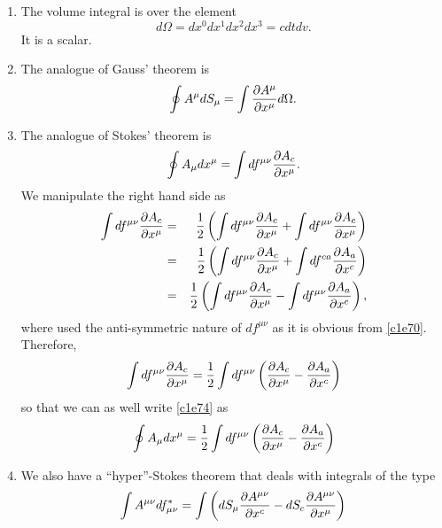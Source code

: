 \begin{enumerate}
\begin{enumerate}
\item The volume integral is over the element
\begin{equation}\label{c1e73}
d\Omega = dx^0 dx^1 dx^2 dx^3 = cdtdv.
\end{equation}
It is a scalar.

\item The analogue of Gauss' theorem is
\begin{equation}\label{c1e74}
\oint A^\mu dS_\mu = \int \frac{\partial{A^\mu}}{\partial{x^\mu}}d\Omega.
\end{equation}

\item The analogue of Stokes' theorem is
\begin{equation}\label{c1e75}
\oint A_\mu dx^\mu = \int df^{\mu\nu}\frac{\partial{A_{c}}}{\partial{x^\mu}}.
\end{equation}
We manipulate the right hand side as
\begin{eqnarray*}
\int df^{\mu\nu}\frac{\partial{A_{c}}}{\partial{x^\mu}} &=& \frac{1}{2}\left(\int df^{\mu\nu}\frac{\partial{A_{c}}}{\partial{x^\mu}} +
\int df^{\mu\nu}\frac{\partial{A_{c}}}{\partial{x^\mu}}\right) \\
&=& \frac{1}{2}\left(\int df^{\mu\nu}\frac{\partial{A_{c}}}{\partial{x^\mu}} + 
    \int df^{c a}\frac{\partial{A_{a}}}{\partial{x^c}}\right) \\
&=& \frac{1}{2}\left(\int df^{\mu\nu}\frac{\partial{A_{c}}}{\partial{x^\mu}} - 
    \int df^{\mu\nu}\frac{\partial{A_{a}}}{\partial{x^c}}\right),
\end{eqnarray*}
where used the anti-symmetric nature of $df^{\mu\nu}$ as it is obvious from 
\eqref{c1e70}. Therefore,
\[
\int df^{\mu\nu}\frac{\partial{A_{c}}}{\partial{x^\mu}} = 
\frac{1}{2}\int df^{\mu\nu}\left(\frac{\partial{A_{c}}}{\partial{x^\mu}} - \frac{\partial{A_{a}}}{\partial{x^c}}\right)
\]
so that we can as well write \eqref{c1e74} as
\begin{equation}\label{c1e76}
\oint A_\mu dx^\mu = \frac{1}{2}\int df^{\mu\nu}
\left(\frac{\partial{A_{c}}}{\partial{x^\mu}} - \frac{\partial{A_{a}}}{\partial{x^c}}\right)
\end{equation}

\item We also have a ``hyper''-Stokes theorem that deals with integrals of the 
type
\begin{equation}\label{c1e77}
\int A^{\mu\nu}df^\ast_{\mu\nu} = 
\int\left(dS_\mu\frac{\partial{A^{\mu\nu}}}{\partial{x^c}} - dS_c\frac{\partial{A^{\mu\nu}}}{\partial{x^\mu}}\right)
\end{equation}
\end{enumerate}


\end{enumerate}
